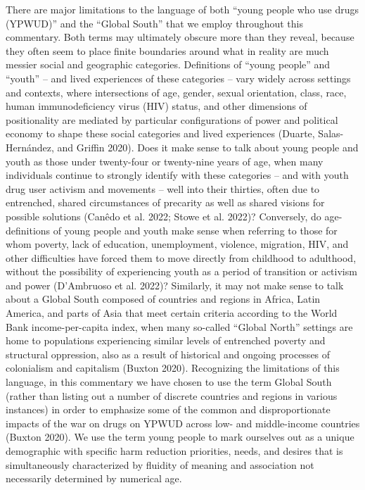 \documentclass[
  letterpaper,
  DIV=11,
  numbers=noendperiod]{scrartcl}
\begin{document}
There are major limitations to the language of both ``young people who
use drugs (YPWUD)'' and the ``Global South'' that we employ throughout
this commentary. Both terms may ultimately obscure more than they
reveal, because they often seem to place finite boundaries around what
in reality are much messier social and geographic categories.
Definitions of ``young people'' and ``youth'' -- and lived experiences
of these categories -- vary widely across settings and contexts, where
intersections of age, gender, sexual orientation, class, race, human
immunodeficiency virus (HIV) status, and other dimensions of
positionality are mediated by particular configurations of power and
political economy to shape these social categories and lived experiences
(Duarte, Salas-Hernández, and Griffin 2020). Does it make sense to talk
about young people and youth as those under twenty-four or twenty-nine
years of age, when many individuals continue to strongly identify with
these categories -- and with youth drug user activism and movements --
well into their thirties, often due to entrenched, shared circumstances
of precarity as well as shared visions for possible solutions (Canêdo et
al. 2022; Stowe et al. 2022)? Conversely, do age-definitions of young
people and youth make sense when referring to those for whom poverty,
lack of education, unemployment, violence, migration, HIV, and other
difficulties have forced them to move directly from childhood to
adulthood, without the possibility of experiencing youth as a period of
transition or activism and power (D'Ambruoso et al. 2022)? Similarly, it
may not make sense to talk about a Global South composed of countries
and regions in Africa, Latin America, and parts of Asia that meet
certain criteria according to the World Bank income-per-capita index,
when many so-called ``Global North'' settings are home to populations
experiencing similar levels of entrenched poverty and structural
oppression, also as a result of historical and ongoing processes of
colonialism and capitalism (Buxton 2020). Recognizing the limitations of
this language, in this commentary we have chosen to use the term Global
South (rather than listing out a number of discrete countries and
regions in various instances) in order to emphasize some of the common
and disproportionate impacts of the war on drugs on YPWUD across low-
and middle-income countries (Buxton 2020). We use the term young people
to mark ourselves out as a unique demographic with specific harm
reduction priorities, needs, and desires that is simultaneously
characterized by fluidity of meaning and association not necessarily
determined by numerical age.
\end{document}

